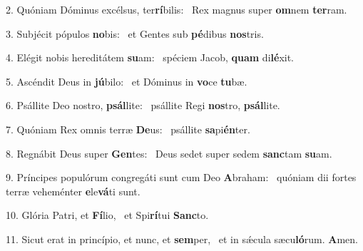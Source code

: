 2. Quóniam Dóminus excélsus, ter\textbf{rí}bilis: \ast\  Rex magnus super \textbf{om}nem \textbf{ter}ram.\

3. Subjécit pópulos \textbf{no}bis: \ast\  et Gentes sub \textbf{pé}dibus \textbf{nos}tris.\

4. Elégit nobis hereditátem \textbf{su}am: \ast\  spéciem Jacob, \textbf{quam} di\textbf{lé}xit.\

5. Ascéndit Deus in \textbf{jú}bilo: \ast\  et Dóminus in \textbf{vo}ce \textbf{tu}bæ.\

6. Psállite Deo nostro, \textbf{psál}lite: \ast\  psállite Regi \textbf{nos}tro, \textbf{psál}lite.\

7. Quóniam Rex omnis terræ \textbf{De}us: \ast\  psállite \textbf{sa}pi\textbf{én}ter.\

8. Regnábit Deus super \textbf{Gen}tes: \ast\  Deus sedet super sedem \textbf{sanc}tam \textbf{su}am.\

9. Príncipes populórum congregáti sunt cum Deo \textbf{A}braham: \ast\  quóniam dii fortes terræ veheménter \textbf{e}le\textbf{vá}ti sunt.\

10. Glória Patri, et \textbf{Fí}lio, \ast\  et Spi\textbf{rí}tui \textbf{Sanc}to.\

11. Sicut erat in princípio, et nunc, et \textbf{sem}per, \ast\  et in sǽcula sæcu\textbf{ló}rum. \textbf{A}men.\

